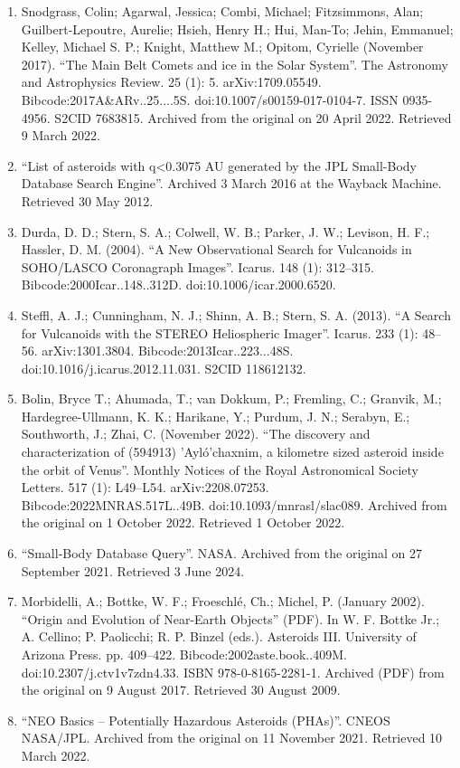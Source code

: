 \begin{enumerate}
\item Snodgrass, Colin; Agarwal, Jessica; Combi, Michael; Fitzsimmons, Alan; Guilbert-Lepoutre, Aurelie; Hsieh, Henry H.; Hui, Man-To; Jehin, Emmanuel; Kelley, Michael S. P.; Knight, Matthew M.; Opitom, Cyrielle (November 2017). ``The Main Belt Comets and ice in the Solar System''. The Astronomy and Astrophysics Review. 25 (1): 5. arXiv:1709.05549. Bibcode:2017A\&ARv..25....5S. doi:10.1007/s00159-017-0104-7. ISSN 0935-4956. S2CID 7683815. Archived from the original on 20 April 2022. Retrieved 9 March 2022.
\item ``List of asteroids with q<0.3075 AU generated by the JPL Small-Body Database Search Engine''. Archived 3 March 2016 at the Wayback Machine. Retrieved 30 May 2012.
\item Durda, D. D.; Stern, S. A.; Colwell, W. B.; Parker, J. W.; Levison, H. F.; Hassler, D. M. (2004). ``A New Observational Search for Vulcanoids in SOHO/LASCO Coronagraph Images''. Icarus. 148 (1): 312–315. Bibcode:2000Icar..148..312D. doi:10.1006/icar.2000.6520.
\item Steffl, A. J.; Cunningham, N. J.; Shinn, A. B.; Stern, S. A. (2013). ``A Search for Vulcanoids with the STEREO Heliospheric Imager''. Icarus. 233 (1): 48–56. arXiv:1301.3804. Bibcode:2013Icar..223...48S. doi:10.1016/j.icarus.2012.11.031. S2CID 118612132.
\item Bolin, Bryce T.; Ahumada, T.; van Dokkum, P.; Fremling, C.; Granvik, M.; Hardegree-Ullmann, K. K.; Harikane, Y.; Purdum, J. N.; Serabyn, E.; Southworth, J.; Zhai, C. (November 2022). ``The discovery and characterization of (594913) 'Ayló'chaxnim, a kilometre sized asteroid inside the orbit of Venus''. Monthly Notices of the Royal Astronomical Society Letters. 517 (1): L49–L54. arXiv:2208.07253. Bibcode:2022MNRAS.517L..49B. doi:10.1093/mnrasl/slac089. Archived from the original on 1 October 2022. Retrieved 1 October 2022.
\item ``Small-Body Database Query''. NASA. Archived from the original on 27 September 2021. Retrieved 3 June 2024.
\item Morbidelli, A.; Bottke, W. F.; Froeschlé, Ch.; Michel, P. (January 2002). ``Origin and Evolution of Near-Earth Objects'' (PDF). In W. F. Bottke Jr.; A. Cellino; P. Paolicchi; R. P. Binzel (eds.). Asteroids III. University of Arizona Press. pp. 409–422. Bibcode:2002aste.book..409M. doi:10.2307/j.ctv1v7zdn4.33. ISBN 978-0-8165-2281-1. Archived (PDF) from the original on 9 August 2017. Retrieved 30 August 2009.
\item ``NEO Basics – Potentially Hazardous Asteroids (PHAs)''. CNEOS NASA/JPL. Archived from the original on 11 November 2021. Retrieved 10 March 2022.

\end{enumerate}
